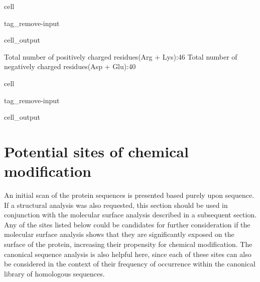 \documentclass[letterpaper,10pt,english]{jupyterBook}
\begin{document}
\begin{sphinxuseclass}{cell}
\begin{sphinxuseclass}{tag_remove-input}\begin{sphinxVerbatimOutput}

\begin{sphinxuseclass}{cell_output}
\begin{sphinxVerbatim}[commandchars=\\\{\}]
Total number of positively charged residues(Arg + Lys):\PYGZhy{}\PYGZhy{}\PYGZhy{}\PYGZhy{}\PYGZhy{}\PYGZhy{}\PYGZhy{}\PYGZhy{}46
Total number of negatively charged residues(Asp + Glu):\PYGZhy{}\PYGZhy{}\PYGZhy{}\PYGZhy{}\PYGZhy{}\PYGZhy{}\PYGZhy{}\PYGZhy{}40
\end{sphinxVerbatim}

\noindent{}

\end{sphinxuseclass}\end{sphinxVerbatimOutput}

\end{sphinxuseclass}
\end{sphinxuseclass}
\begin{sphinxuseclass}{cell}
\begin{sphinxuseclass}{tag_remove-input}\begin{sphinxVerbatimOutput}

\begin{sphinxuseclass}{cell_output}
\noindent{}

\end{sphinxuseclass}\end{sphinxVerbatimOutput}

\end{sphinxuseclass}
\end{sphinxuseclass}

\section{Potential sites of chemical modification}
\label{\detokenize{ipynb/chapter1:potential-sites-of-chemical-modification}}
\sphinxAtStartPar
An initial scan of the protein sequences is presented based purely upon sequence. If a structural analysis was also requested, this section should be used in conjunction with the molecular surface analysis described in a subsequent section. Any of the sites listed below could be candidates for further consideration if the molecular surface analysis shows that they are significantly exposed on the surface of the protein, increasing their propensity for chemical modification. The canonical sequence analysis is also helpful here, since each of these sites can also be considered in the context of their frequency of occurrence within the canonical library of homologous sequences.
\end{document}
